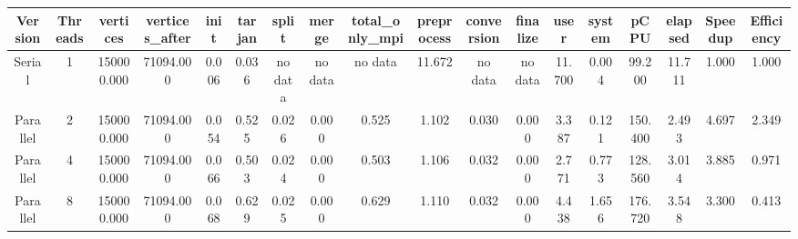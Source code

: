 \begin{tabular}{|c|c|c|c|c|c|c|c|c|c|c|c|c|c|c|c|c|c|}
\toprule
 Version &  Threads &   vertices &  vertices\_after &  init &  tarjan &   split &   merge & total\_only\_mpi &  preprocess & conversion & finalize &   user &  system &    pCPU &  elapsed &  Speedup &  Efficiency \\
\midrule
  Serial &        1 & 150000.000 &       71094.000 & 0.006 &   0.036 & no data & no data &        no data &      11.672 &    no data &  no data & 11.700 &   0.004 &  99.200 &   11.711 &    1.000 &       1.000 \\
Parallel &        2 & 150000.000 &       71094.000 & 0.054 &   0.525 &   0.026 &   0.000 &          0.525 &       1.102 &      0.030 &    0.000 &  3.387 &   0.121 & 150.400 &    2.493 &    4.697 &       2.349 \\
Parallel &        4 & 150000.000 &       71094.000 & 0.066 &   0.503 &   0.024 &   0.000 &          0.503 &       1.106 &      0.032 &    0.000 &  2.771 &   0.773 & 128.560 &    3.014 &    3.885 &       0.971 \\
Parallel &        8 & 150000.000 &       71094.000 & 0.068 &   0.629 &   0.025 &   0.000 &          0.629 &       1.110 &      0.032 &    0.000 &  4.438 &   1.656 & 176.720 &    3.548 &    3.300 &       0.413 \\
\bottomrule
\end{tabular}
